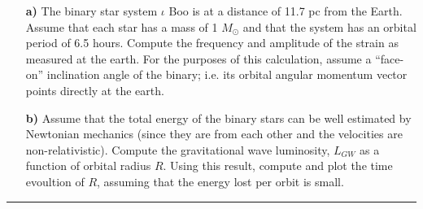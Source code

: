 \documentclass[12pt,twoside]{article}
\begin{document}
\begin{enumerate}
\begin{itemize}
\item[\bf a)] The binary star system $\iota$ Boo is at a distance of
  11.7 pc from the Earth. Assume that each star has a mass of 1
  $M_{\odot}$ and that the system has an orbital period of 6.5
  hours. Compute the frequency and amplitude of the strain as measured
  at the earth. 
For the purposes of this calculation, assume a
  ``face-on'' inclination angle of the binary; i.e. its orbital
  angular momentum vector points directly at the earth.

\item[\bf b)] Assume that the total energy of the binary stars can
  be well estimated by Newtonian mechanics (since they are from each
  other and the velocities are non-relativistic). Compute the
  gravitational wave luminosity, $L_{GW}$ as a function of orbital
  radius $R$. Using this result, compute and plot the time evoultion
  of $R$, assuming that the energy lost per orbit is small.

\end{itemize}



  



\end{enumerate}

\bigskip
{\color{awesome} \hrule}
\end{document}
